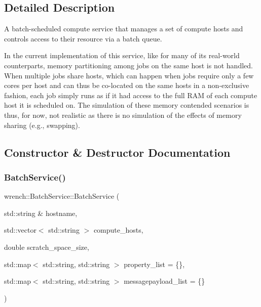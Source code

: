 \subsection{Detailed Description}
A batch-\/scheduled compute service that manages a set of compute hosts and controls access to their resource via a batch queue. 

In the current implementation of this service, like for many of its real-\/world counterparts, memory partitioning among jobs on the same host is not handled. When multiple jobs share hosts, which can happen when jobs require only a few cores per host and can thus be co-\/located on the same hosts in a non-\/exclusive fashion, each job simply runs as if it had access to the full R\+AM of each compute host it is scheduled on. The simulation of these memory contended scenarios is thus, for now, not realistic as there is no simulation of the effects of memory sharing (e.\+g., swapping). 

\subsection{Constructor \& Destructor Documentation}
\mbox{\label{classwrench_1_1_batch_service_a2f91405c977001fa52acda0fe849f143}} 
\subsubsection{\texorpdfstring{Batch\+Service()}{BatchService()}}
{\footnotesize\ttfamily wrench\+::\+Batch\+Service\+::\+Batch\+Service (\begin{DoxyParamCaption}\item[{std\+::string \&}]{hostname,  }\item[{std\+::vector$<$ std\+::string $>$}]{compute\+\_\+hosts,  }\item[{double}]{scratch\+\_\+space\+\_\+size,  }\item[{std\+::map$<$ std\+::string, std\+::string $>$}]{property\+\_\+list = {\ttfamily \{\}},  }\item[{std\+::map$<$ std\+::string, std\+::string $>$}]{messagepayload\+\_\+list = {\ttfamily \{\}} }\end{DoxyParamCaption})}




